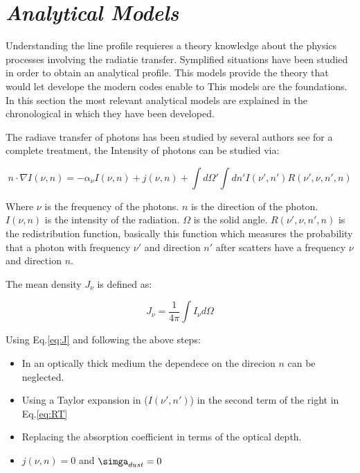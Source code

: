   

\section{\emph{Analytical Models}}\label{sec:analytic}

Understanding the \ly line profile requieres a theory knowledge
about the physics processes involving the radiatie transfer. Symplified 
situations have been studied in order to obtain an analytical 
 profile. This models provide the theory that
would let develope the modern codes enable to 
This models are the foundations. In this section the most relevant 
analytical models are explained in the chronological in which 
they have been developed. 

The radiave transfer of \ly photons has been studied by several authors
see \citep{RybickiLightman79} for a complete treatment, the Intensity
of \ly photons can be studied via:
 
\begin{equation}\label{eq:RT}
n\cdot\nabla I(\nu, n)= - \alpha_{\nu} I(\nu, n) + j(\nu, n) + \int d\Omega' \int dn' I(\nu', n') R(\nu', \nu, n', n)
\end{equation}

Where $\nu$ is the frequency of the \ly photons. $n$ is the direction 
of the \ly photon. $I(\nu, n)$ is the intensity
of the radiation. $\Omega$ is the solid angle. $R(\nu', \nu, n', n)$ 
is the redistribution function, basically this function which measures 
the probability that a \ly photon with frequency $\nu'$ and direction $n'$
after scatters have a frequency $\nu$ and direction $n$.

The mean density $J_{\nu}$ is defined as:

\begin{equation}\label{eq:J}
J_{\nu} = \dfrac{1}{4\pi}\int I_{\nu}d\Omega
\end{equation}


Using Eq.\ref{eq:J} and following the above steps:

\begin{itemize}
\item In an optically thick medium the dependece on the direcion {\bf{$n$}} can 
be neglected.
\item Using a Taylor expansion in ($I(\nu', n')$) in the second term of the right in Eq.\ref{eq:RT} 
\item Replacing the absorption coefficient in terms of the optical depth.
\item $j(\nu, n)=0$ and $\simga_{dust}=0$
\end{itemize}

